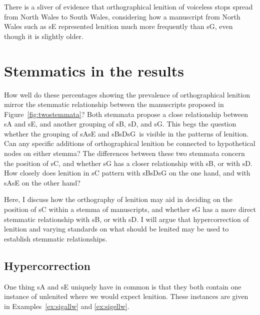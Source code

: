 There is a sliver of evidence that orthographical lenition of voiceless stops spread from North Wales to South Wales, considering how a manuscript from North Wales such as \gls{sE} represented lenition much more frequently than \gls{sG}, even though it is slightly older.

\section{Stemmatics in the results}
\label{sec:stemmatics-laws}

How well do these percentages showing the prevalence of orthographical lenition mirror the stemmatic relationship between the manuscripts proposed in Figure~\ref{fig:twostemmata}? Both stemmata propose a close relationship between \gls{sA} and \gls{sE}, and another grouping of \gls{sB}, \gls{sD}, and \gls{sG}. This begs the question whether the grouping of \gls{sA}\gls{sE} and \gls{sB}\gls{sD}\gls{sG}\ is visible in the patterns of lenition. Can any specific additions of orthographical lenition be connected to hypothetical nodes on either stemma? The differences between these two stemmata concern the position of \gls{sC}, and whether \gls{sG} has a closer relationship with \gls{sB}, or with \gls{sD}. How closely does lenition in \gls{sC} pattern with \gls{sB}\gls{sD}\gls{sG} on the one hand, and with \gls{sA}\gls{sE} on the other hand?  

Here, I discuss how the orthography of lenition may aid in deciding on the position of \gls{sC} within a stemma of manuscripts, and whether \gls{sG} has a more direct stemmatic relationship with \gls{sB}, or with \gls{sD}. I will argue that hypercorrection of lenition and varying standards on what should be lenited may be used to establish stemmatic relationships.
\subsection{Hypercorrection}
\label{sec:hypercorrection}

One thing \gls{sA} and \gls{sE} uniquely have in common is that they both contain one instance of unlenited  where we would expect lenition. These instances are given in Examples~\ref{ex:sigallw} and \ref{ex:sigellw}.
\begin{mwl}
\end{mwl}

